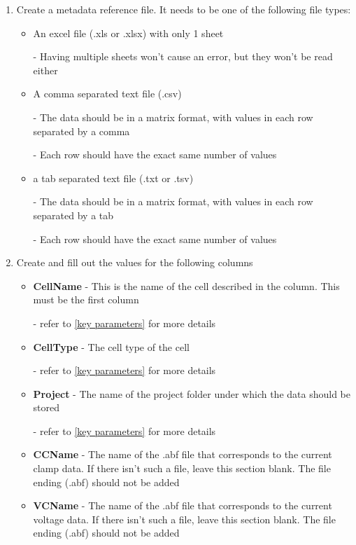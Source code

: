 \documentclass{article}
\begin{document}
\begin{enumerate}
    \item Create a metadata reference file. It needs to be one of the following file types:
    \begin{itemize}
        \item An excel file (.xls or .xlsx) with only 1 sheet
        
        - Having multiple sheets won't cause an error, but they won't be read either
        
        \item A comma separated text file (.csv)
        
        - The data should be in a matrix format, with values in each row separated by a comma
        
        - Each row should have the exact same number of values
        
        \item a tab separated text file (.txt or .tsv)
        
        - The data should be in a matrix format, with values in each row separated by a tab
        
        - Each row should have the exact same number of values
    \end{itemize}
    \item Create and fill out the values for the following columns
    \begin{itemize}
        \item \textbf{CellName} - This is the name of the cell described in the column. This must be the first column
        
        - refer to \ref{key parameters} for more details
        \item \textbf{CellType} - The cell type of the cell
        
        - refer to \ref{key parameters} for more details
        \item \textbf{Project} - The name of the project folder under which the data should be stored
        
        - refer to \ref{key parameters} for more details
        
        \item \textbf{CCName} - The name of the .abf file that corresponds to the current clamp data. If there isn't such a file, leave this section blank. The file ending (.abf) should not be added
        
        \item \textbf{VCName} - The name of the .abf file that corresponds to the current voltage data. If there isn't such a file, leave this section blank. The file ending (.abf) should not be added
        

\end{itemize}
\end{enumerate}
\end{document}
